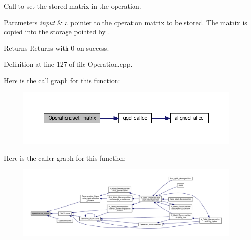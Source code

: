 Call to set the stored matrix in the operation. 


\begin{DoxyParams}{Parameters}
{\em input} & a pointer to the operation matrix to be stored. The matrix is copied into the storage pointed by . \\
\hline
\end{DoxyParams}
\begin{DoxyReturn}{Returns}
Returns with 0 on success. 
\end{DoxyReturn}


Definition at line 127 of file Operation.\+cpp.



Here is the call graph for this function\+:
\nopagebreak
\begin{figure}[H]
\begin{center}
\leavevmode
\includegraphics[width=350pt]{class_operation_a026d3dcf0ad00af99c7a9097d3cf1c74_cgraph}
\end{center}
\end{figure}




Here is the caller graph for this function\+:
\nopagebreak
\begin{figure}[H]
\begin{center}
\leavevmode
\includegraphics[width=350pt]{class_operation_a026d3dcf0ad00af99c7a9097d3cf1c74_icgraph}
\end{center}
\end{figure}


